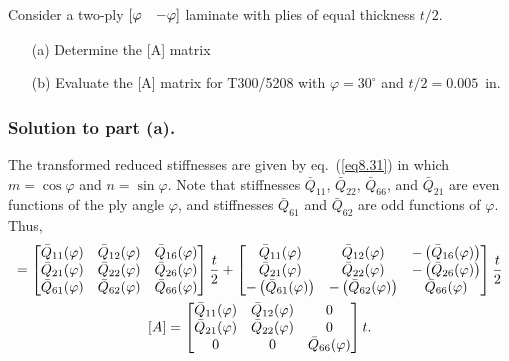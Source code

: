 \documentclass{AeroStructure-ERJohnson}
\begin{document}
\begin{example*}\label{ex8.2}Consider a two-ply
$[\begin{array}{@{}ll@{}} \varphi & -\varphi
\end{array}]$ laminate with plies of equal thickness $t/2$.
\begin{enumerate}[(a)]\leftskip=3pt
\item[(a)] Determine the [A] matrix
\item[(b)] Evaluate the [A] matrix for T300/5208 with $\varphi=30^{\circ}$
and $t/2=0.005$~in.
\end{enumerate}

\subsubsection{Solution to part (a).} The transformed reduced stiffnesses
are given by eq.~(\ref{eq8.31}) in which $m=\cos \varphi$ and
$n=\sin \varphi$. Note that stiffnesses $\bar{Q}_{11}$,
$\bar{Q}_{22}$, $\bar{Q}_{66}$, and $\bar{Q}_{21}$ are even
functions of the ply angle $\varphi$, and stiffnesses
$\bar{Q}_{61}$ and $\bar{Q}_{62}$ are odd functions of $\varphi$.
Thus,
\begin{gather*}
[A]=\left[\begin{array}{@{}ccc@{}} \bar{Q}_{11}(\varphi) &
\bar{Q}_{12}(\varphi) & \bar{Q}_{16}(\varphi)\\
\bar{Q}_{21}(\varphi) & \bar{Q}_{22}(\varphi) &
\bar{Q}_{26}(\varphi)\\
\bar{Q}_{61}(\varphi) &
\bar{Q}_{62}(\varphi) & \bar{Q}_{66}(\varphi) \end{array}\right]
\frac{t}{2}+\left[\begin{array}{@{}ccc@{}} \bar{Q}_{11}(\varphi) &
\bar{Q}_{12}(\varphi) & -\left(\bar{Q}_{16}(\varphi)\right)\\
\bar{Q}_{21}(\varphi) & \bar{Q}_{22}(\varphi) &
-\left(\bar{Q}_{26}(\varphi)\right)\\
-\left(\bar{Q}_{61}(\varphi)\right) &
-\left(\bar{Q}_{62}(\varphi)\right) & \bar{Q}_{66}(\varphi)
\end{array}\right] \frac{t}{2}\\
[A]=\left[\begin{array}{@{}ccc@{}}\bar{Q}_{11}(\varphi) &
\bar{Q}_{12}(\varphi) & 0\\
\bar{Q}_{21}(\varphi) &
\bar{Q}_{22}(\varphi) & 0\\
0 & 0 &
\bar{Q}_{66}(\varphi)\end{array}\right] t.
\end{gather*}


\end{example*}
\end{document}
